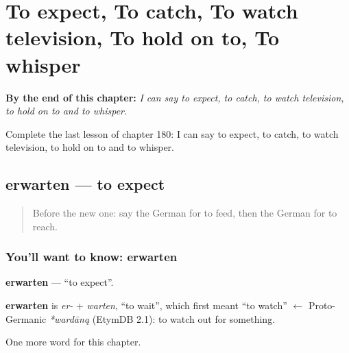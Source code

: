 
\chapter{To expect, To catch, To watch television, To hold on to, To whisper}
\label{ch:ge-to-expect-to-catch-to-watch-television-to-hold-on-to-to-whisper}

\begin{chapteropening}
\textbf{By the end of this chapter:} \emph{I can say to expect, to catch, to watch television, to hold on to and to whisper.}

Complete the last lesson of chapter 180: I can say to expect, to catch, to watch television, to hold on to and to whisper.
\end{chapteropening}

\section[erwarten]{erwarten — to expect}

\label{lesson:GE-C180-erwarten}



\begin{quote}
Before the new one: say the German for to feed, then the German for to reach.
\end{quote}

\subsection*{You'll want to know: erwarten}
\textbf{erwarten} — \textquotedblleft{}to expect\textquotedblright{}.

\begin{cousinweb}
\textbf{erwarten} is \emph{er-} + \emph{warten}, \textquotedblleft{}to wait\textquotedblright{}, which first meant \textquotedblleft{}to watch\textquotedblright{} $\leftarrow$ Proto-Germanic \emph{*wardāną} (EtymDB 2.1): to watch out for something.
\end{cousinweb}

\begin{grammarlens}[title={What you've built}]
One more word for this chapter.
\end{grammarlens}

